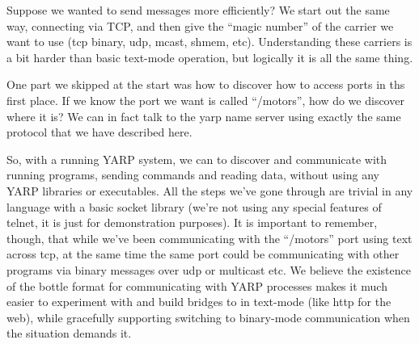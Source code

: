 Suppose we wanted to send messages more efficiently?  We start out the
same way, connecting via TCP, and then give the ``magic number'' of
the carrier we want to use (tcp binary, udp, mcast, shmem, etc).
Understanding these carriers is a bit harder than basic text-mode operation,
but logically it is all the same thing.

One part we skipped at the start was how to discover how to 
access ports in ths first place.  If we know the port we want
is called ``/motors'', how do we discover where it is?  We can
in fact talk to the yarp name server using exactly the same 
protocol that we have described here.





%

So, with a running YARP system, we can to discover
and communicate with running programs, sending commands and reading
data, without using any YARP libraries or executables.  All the steps
we've gone through are trivial in any language with a basic socket
library (we're not using any special features of telnet, it is just
for demonstration purposes).  It is important to remember, though,
that while we've been communicating with the ``/motors'' port using
text across tcp, at the same time the same port could be communicating
with other programs via binary messages over udp or multicast etc.
%
We believe the existence of the bottle format for communicating
with YARP processes makes it much easier to experiment with and build
bridges to in text-mode (like http for the web), while gracefully
supporting switching to binary-mode communication when the 
situation demands it.


